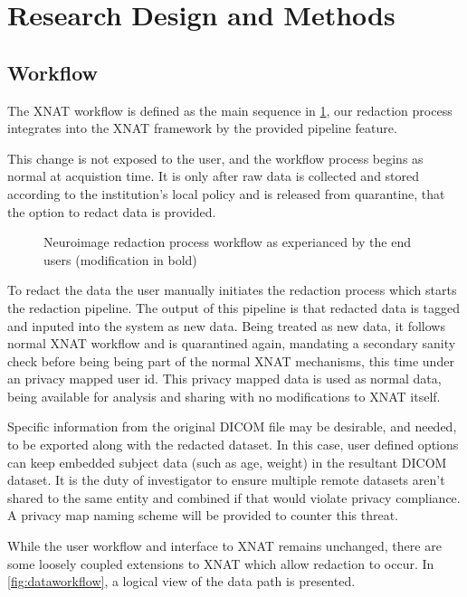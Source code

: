 \section*{Research Design and Methods}
\subsection*{Workflow}
The XNAT workflow is defined as the main sequence in \ref{fig:workflow}\cite{xnat}, our redaction process integrates into the XNAT framework by the provided pipeline feature.

This change is not exposed to the user, and the workflow process begins as normal at acquistion time. It is only after raw data is collected and stored according to the institution's local policy and is released from quarantine, that the option to redact data is provided.

\begin{figure}[hbt]
        \caption{\label{fig:workflow} Neuroimage redaction process workflow as experianced by the end users (modification in bold)}
\end{figure}

To redact the data the user manually initiates the redaction process which starts the redaction pipeline. The output of this pipeline is that redacted data is tagged and inputed into the system as new data. Being treated as new data, it follows normal XNAT workflow and is quarantined again, mandating a secondary sanity check before being being part of the normal XNAT mechanisms, this time under an privacy mapped user id. This privacy mapped data is used as normal data, being available for analysis and sharing with no modifications to XNAT itself.

Specific information from the original DICOM file may be desirable, and needed, to be exported along with the redacted dataset. In this case, user defined options can keep embedded subject data (such as age, weight) in the resultant DICOM dataset. It is the duty of investigator to ensure multiple remote datasets aren't shared to the same entity and combined if that would violate privacy compliance. A privacy map naming scheme will be provided to counter this threat\cite{ohm}. 

While the user workflow and interface to XNAT remains unchanged, there are some loosely coupled extensions to XNAT which allow redaction to occur. In \ref{fig:dataworkflow}, a logical view of the data path is presented. 


